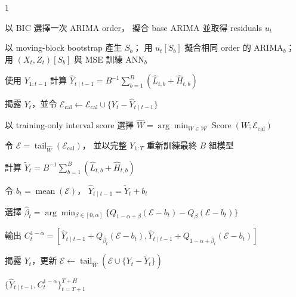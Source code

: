 {\begin{algorithm}[htbp]
\begin{spacing}{1}
\begin{algorithmic}[1]
    \State
    以 BIC 選擇一次 ARIMA order，
    擬合 base ARIMA 並取得 residuals $u_t$


        \State
        以 moving-block bootstrap 產生 $S_b$；
        用 $u_t[S_b]$ 擬合相同 order 的 ARIMA$_b$；
        用 $(X_t,Z_t)[S_b]$ 與 MSE 訓練 ANN$_b$

    \EndFor


        \State
        使用 $Y_{1:t-1}$ 計算
        $\widehat Y_{t\mid t-1}
        =B^{-1}\sum_{b=1}^{B}
        (\widehat L_{t,b}+\widehat H_{t,b})$

        \State
        揭露 $Y_t$，並令
        $\mathcal E_{\mathrm{cal}}
        \gets\mathcal E_{\mathrm{cal}}
        \cup\{Y_t-\widehat Y_{t\mid t-1}\}$

    \EndFor
\EndFor

\State
以 training-only interval score 選擇
$\widehat W
=\arg\min_{W\in\mathcal W}
\operatorname{Score}(W;\mathcal E_{\mathrm{cal}})$

\State
令 $\mathcal E
=\operatorname{tail}_{\widehat W}
(\mathcal E_{\mathrm{cal}})$，
並以完整 $Y_{1:T}$ 重新訓練最終 $B$ 組模型


    \State
    計算
    $\widetilde Y_t
    =B^{-1}\sum_{b=1}^{B}
    (\widehat L_{t,b}+\widehat H_{t,b})$

    \State
    令 $b_t=\operatorname{mean}(\mathcal E)$，
    $\widehat Y_{t\mid t-1}=\widetilde Y_t+b_t$

    \State
    選擇
    $\widehat\beta_t
    =\arg\min_{\beta\in[0,\alpha]}
    \{Q_{1-\alpha+\beta}(\mathcal E-b_t)
    -Q_\beta(\mathcal E-b_t)\}$

    \State
    輸出
    $C_t^{1-\alpha}
    =[\widehat Y_{t\mid t-1}
    +Q_{\widehat\beta_t}(\mathcal E-b_t),
    \widehat Y_{t\mid t-1}
    +Q_{1-\alpha+\widehat\beta_t}(\mathcal E-b_t)]$

    \State
    揭露 $Y_t$，更新
    $\mathcal E\gets
    \operatorname{tail}_{\widehat W}
    (\mathcal E\cup\{Y_t-\widetilde Y_t\})$

\EndFor

\State \Return
$\{\widehat Y_{t\mid t-1},C_t^{1-\alpha}\}_{t=T+1}^{T+H}$

\end{algorithmic}
\end{spacing}
\end{algorithm}

}

